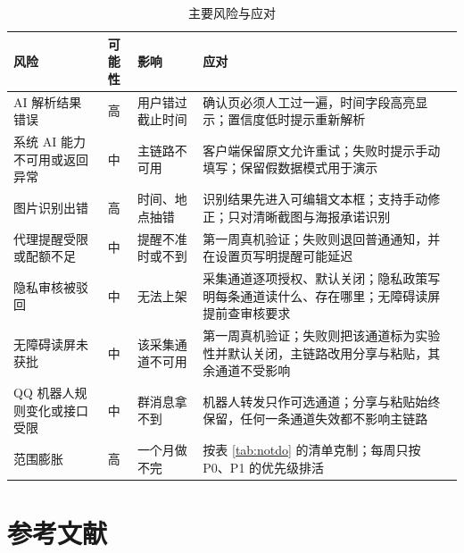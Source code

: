 \documentclass[12pt,a4paper,fontset=windows]{ctexart}
\begin{document}
\begin{table}[H]
\centering
\footnotesize
\begin{tabularx}{\textwidth}{@{}>{\raggedright\arraybackslash}p{2.9cm}c>{\raggedright\arraybackslash}p{2.5cm}>{\raggedright\arraybackslash}X@{}}
\toprule
风险 & 可能性 & 影响 & 应对 \\
\midrule
AI 解析结果错误 & 高 & 用户错过截止时间 & 确认页必须人工过一遍，时间字段高亮显示；置信度低时提示重新解析 \\
系统 AI 能力不可用或返回异常 & 中 & 主链路不可用 & 客户端保留原文允许重试；失败时提示手动填写；保留假数据模式用于演示 \\
图片识别出错 & 高 & 时间、地点抽错 & 识别结果先进入可编辑文本框；支持手动修正；只对清晰截图与海报承诺识别 \\
代理提醒受限或配额不足 & 中 & 提醒不准时或不到 & 第一周真机验证；失败则退回普通通知，并在设置页写明提醒可能延迟 \\
隐私审核被驳回 & 中 & 无法上架 & 采集通道逐项授权、默认关闭；隐私政策写明每条通道读什么、存在哪里；无障碍读屏提前查审核要求 \\
无障碍读屏未获批 & 中 & 该采集通道不可用 & 第一周真机验证；失败则把该通道标为实验性并默认关闭，主链路改用分享与粘贴，其余通道不受影响 \\
QQ 机器人规则变化或接口受限 & 中 & 群消息拿不到 & 机器人转发只作可选通道；分享与粘贴始终保留，任何一条通道失效都不影响主链路 \\
范围膨胀 & 高 & 一个月做不完 & 按表 \ref{tab:notdo} 的清单克制；每周只按 P0、P1 的优先级排活 \\
\bottomrule
\end{tabularx}
\caption{主要风险与应对}
\label{tab:risk}
\end{table}

\newpage
\section*{参考文献}
\end{document}
